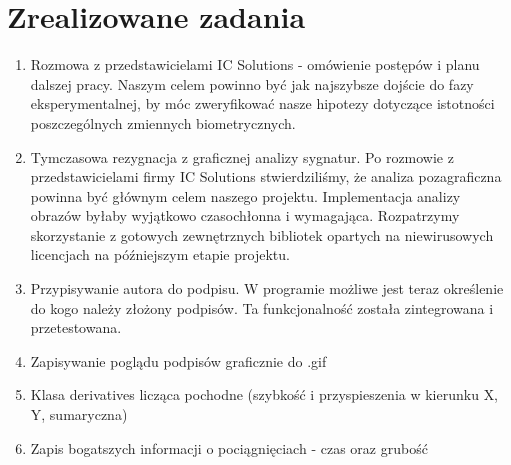 \documentclass{mwrep}
\begin{document}
{\let\clearpage\relax 
\chapter{Zrealizowane zadania}}
\begin{enumerate}
    \item Rozmowa z przedstawicielami IC Solutions - omówienie postępów i planu dalszej pracy. 
    Naszym celem powinno być jak najszybsze dojście do fazy eksperymentalnej, by móc zweryfikować nasze hipotezy dotyczące istotności poszczególnych zmiennych biometrycznych.
    \item Tymczasowa rezygnacja z graficznej analizy sygnatur. 
    Po rozmowie z przedstawicielami firmy IC Solutions stwierdziliśmy, że analiza pozagraficzna powinna być głównym celem naszego projektu. Implementacja analizy obrazów byłaby wyjątkowo czasochłonna i wymagająca. Rozpatrzymy skorzystanie z gotowych zewnętrznych bibliotek opartych na niewirusowych licencjach na późniejszym etapie projektu.
    \item Przypisywanie autora do podpisu. W programie możliwe jest teraz określenie do kogo należy złożony podpisów. Ta funkcjonalność została zintegrowana i przetestowana.
	\item Zapisywanie poglądu podpisów graficznie do .gif
	\item Klasa derivatives licząca pochodne (szybkość i przyspieszenia w kierunku X, Y, sumaryczna)
	\item Zapis bogatszych informacji o pociągnięciach - czas oraz grubość
	\end{enumerate}
\end{document}
